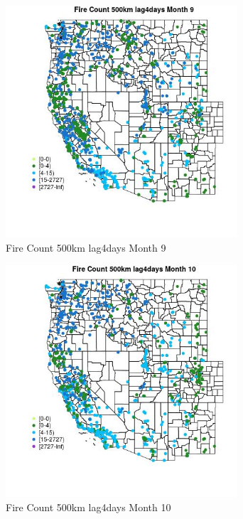\begin{figure} 
\centering  
\includegraphics[width=0.77\textwidth]{Code_Outputs/Report_ML_input_PM25_Step4_part_f_de_duplicated_aves_prioritize_24hr_obswNAs_MapObsMo9Fire_Count_500km_lag4days.jpg} 
\caption{\label{fig:Report_ML_input_PM25_Step4_part_f_de_duplicated_aves_prioritize_24hr_obswNAsMapObsMo9Fire_Count_500km_lag4days}Fire Count 500km lag4days Month 9} 
\end{figure} 
 

\clearpage 

\begin{figure} 
\centering  
\includegraphics[width=0.77\textwidth]{Code_Outputs/Report_ML_input_PM25_Step4_part_f_de_duplicated_aves_prioritize_24hr_obswNAs_MapObsMo10Fire_Count_500km_lag4days.jpg} 
\caption{\label{fig:Report_ML_input_PM25_Step4_part_f_de_duplicated_aves_prioritize_24hr_obswNAsMapObsMo10Fire_Count_500km_lag4days}Fire Count 500km lag4days Month 10} 
\end{figure} 
 

